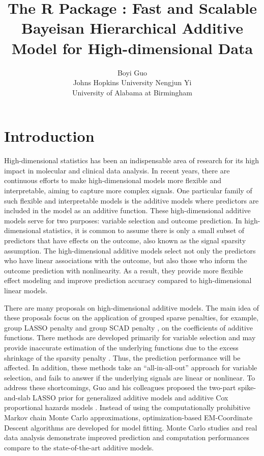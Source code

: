 \documentclass[
]{jss}
\author{
Boyi Guo\\Johns Hopkins University \And Nengjun Yi\\University of
Alabama at Birmingham
}
\title{The R Package \pkg{BHAM}: Fast and Scalable Bayeisan Hierarchical
Additive Model for High-dimensional Data}
\begin{document}
\newcommand{\pr}{\text{Pr}}
\newcommand{\bs}[1]{\boldsymbol{#1}}
\newcommand{\tp}{*}
\newcommand{\simiid}{\overset{\text{iid}}{\sim}}

\section{Introduction}

High-dimensional statistics has been an indispensable area of research
for its high impact in molecular and clinical data analysis. In recent
years, there are continuous efforts to make high-dimensional models more
flexible and interpretable, aiming to capture more complex signals. One
particular family of such flexible and interpretable models is the
additive models where predictors are included in the model as an
additive function. These high-dimensional additive models serve for two
purposes: variable selection and outcome prediction. In high-dimensional
statistics, it is common to assume there is only a small subset of
predictors that have effects on the outcome, also known as the signal
sparsity assumption. \citep{buhlmann2011} The high-dimensional additive
models select not only the predictors who have linear associations with
the outcome, but also those who inform the outcome prediction with
nonlinearity. As a result, they provide more flexible effect modeling
and improve prediction accuracy compared to high-dimensional linear
models.

There are many proposals on high-dimensional additive models. The main
idea of these proposals focus on the application of grouped sparse
penalties, for example, group LASSO penalty
\citep{ravikumar2009, huang2010} and group SCAD penalty
\citep{wang2007, xue2009}, on the coefficients of additive functions.
There methods are developed primarily for variable selection and may
provide inaccurate estimation of the underlying functions due to the
excess shrinkage of the sparsity penalty \citep{scheipl2013}. Thus, the
prediction performance will be affected. In addition, these methods take
an ``all-in-all-out'' approach for variable selection, and fails to
answer if the underlying signals are linear or nonlinear. To address
these shortcomings, Guo and his colleagues proposed the two-part
spike-and-slab LASSO prior for generalized additive models
\citep{guo2022_GAM} and additive Cox proportional hazards models
\citep{guo2022_Cox}. Instead of using the computationally prohibitive
Markov chain Monte Carlo approximations, optimization-based
EM-Coordinate Descent algorithms are developed for model fitting. Monte
Carlo studies and real data analysis demonstrate improved prediction and
computation performances compare to the state-of-the-art additive
models.
\end{document}
